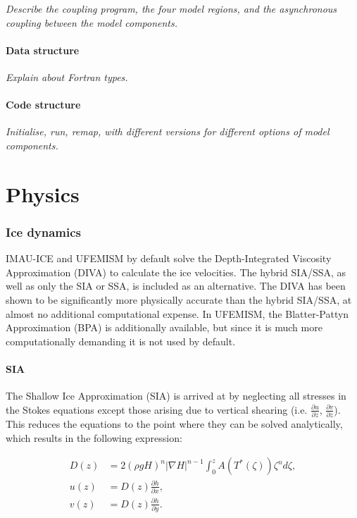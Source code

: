 \documentclass{article}
\begin{document}
\textit{Describe the coupling program, the four model regions, and the asynchronous coupling between the model components.}

\subsection{Data structure}

\textit{Explain about Fortran types.}

\subsection{Code structure}

\textit{Initialise, run, remap, with different versions for different options of model components.}

\newpage
\part{Physics}

\section{Ice dynamics}

IMAU-ICE and UFEMISM by default solve the Depth-Integrated Viscosity Approximation (DIVA) to calculate the ice velocities. The hybrid SIA/SSA, as well as only the SIA or SSA, is included as an alternative. The DIVA has been shown to be significantly more physically accurate than the hybrid SIA/SSA, at almost no additional computational expense. In UFEMISM, the Blatter-Pattyn Approximation (BPA) is additionally available, but since it is much more computationally demanding it is not used by default.

\subsection{SIA}

The Shallow Ice Approximation (SIA) is arrived at by neglecting all stresses in the Stokes equations except those arising due to vertical shearing (i.e. $\frac{\partial u}{\partial z}$, $\frac{\partial v}{\partial z}$). This reduces the equations to the point where they can be solved analytically, which results in the following expression:

\begin{align} \label{eq:SIA_01}
D(z) &= 2 {\left( \rho g H \right)}^n {\left| \nabla H \right|}^{n-1} \int_0^z A \left( T^{\ast} \left( \zeta \right) \right) \zeta^n d\zeta, \\
u(z) &= D(z) \frac{\partial h}{\partial x}, \\
v(z) &= D(z) \frac{\partial h}{\partial y}.
\end{align}
\end{document}
